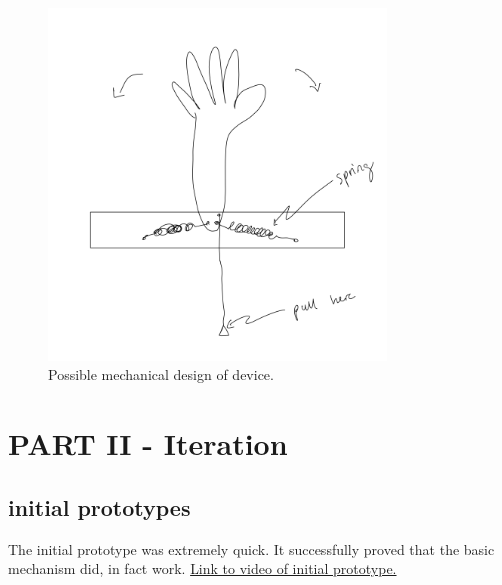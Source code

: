 \documentclass[11pt]{report}
\begin{document}
\begin{figure}[ht]
\centering
\includegraphics[width=0.8\textwidth]{"images/I/wavemachine_sketch.png"}
\caption{Possible mechanical design of device.}
\label{fig:sketch}
\end{figure}

\clearpage
\section*{PART II - Iteration}
\subsection*{initial prototypes}

The initial prototype was extremely quick. It successfully proved that the basic mechanism did, in fact work. \href{https://drive.google.com/file/d/1A-JF5d3mOUxOp_nL0GExQ2gzeuzpgY3x/view?usp=sharing}{Link to video of initial prototype.}
\end{document}
